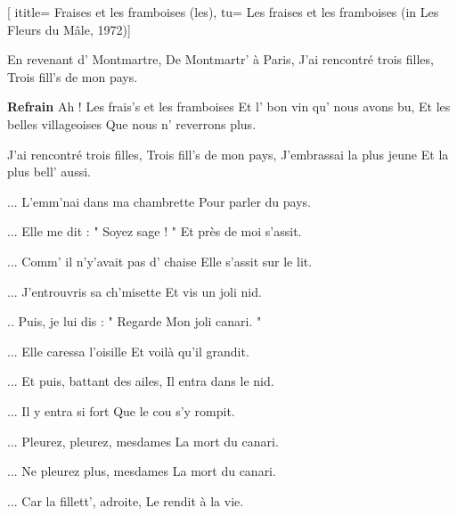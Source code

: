  [
ititle= {Fraises et les framboises (les)},
tu= {Les fraises et les framboises (in Les Fleurs du Mâle, 1972)}]

\beginverse
En revenant d' Montmartre,
De Montmartr' à Paris,
J'ai rencontré trois filles,
Trois fill's de mon pays.
\endverse

\beginchorus
\textbf {Refrain}
Ah ! Les frais's et les framboises
Et l' bon vin qu' nous avons bu,
Et les belles villageoises
Que nous n' reverrons plus.
\endchorus

\beginverse
J'ai rencontré trois filles,
Trois fill's de mon pays,
J'embrassai la plus jeune
Et la plus bell' aussi.
\endverse

\beginverse
... L'emm'nai dans ma chambrette
Pour parler du pays.
\endverse

\beginverse
... Elle me dit : " Soyez sage ! "
Et près de moi s'assit.
\endverse

\beginverse
... Comm' il n'y'avait pas d' chaise
Elle s'assit sur le lit.
\endverse

\beginverse
... J'entrouvris sa ch'misette
Et vis un joli nid.
\endverse

\beginverse
.. Puis, je lui dis : " Regarde
Mon joli canari. "
\endverse

\beginverse
... Elle caressa l'oisille
Et voilà qu'il grandit.
\endverse

\beginverse
... Et puis, battant des ailes,
Il entra dans le nid.
\endverse

\beginverse
... Il y entra si fort
Que le cou s'y rompit.
\endverse

\beginverse
... Pleurez, pleurez, mesdames
La mort du canari.
\endverse

\beginverse
... Ne pleurez plus, mesdames
La mort du canari.
\endverse

\beginverse
... Car la fillett', adroite,
Le rendit à la vie.
\endverse

\endsong